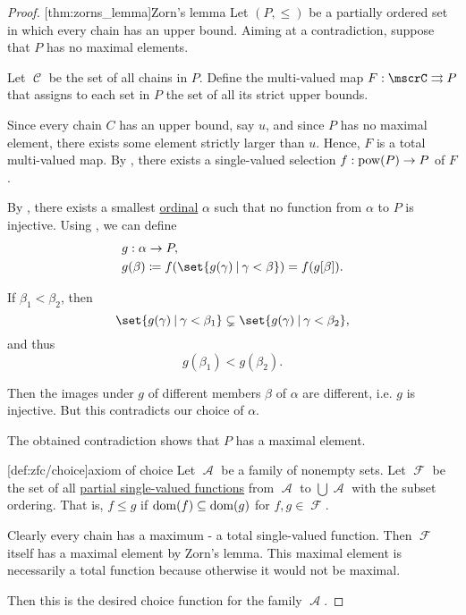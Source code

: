 \begin{proof}
  [thm:zorns_lemma]{Zorn's lemma} Let \( (P, \leq) \) be a partially ordered set in which every chain has an upper bound. Aiming at a contradiction, suppose that \( P \) has no maximal elements.

  Let \( \mscrC \) be the set of all chains in \( P \). Define the multi-valued map \( F: \mscrC \multto P \) that assigns to each set in \( P \) the set of all its strict upper bounds.

  Since every chain \( C \) has an upper bound, say \( u \), and since \( P \) has no maximal element, there exists some element strictly larger than \( u \). Hence, \( F \) is a total multi-valued map. By , there exists a single-valued selection \( f: \operatorname{pow}(P) \to P \) of \( F \).

  By , there exists a smallest \hyperref[def:ordinal]{ordinal} \( \alpha \) such that no function from \( \alpha \) to \( P \) is injective. Using , we can define
  \begin{equation*}
    \begin{aligned}
      &g: \alpha \to P, \\
      &g(\beta) \coloneqq f(\set{ g(\gamma) \given \gamma < \beta }) = f(g[\beta]). \\
    \end{aligned}
  \end{equation*}

  If \( \beta_1 < \beta_2 \), then
  \begin{equation*}
    \set{ g(\gamma) \given \gamma < \beta_1 }
    \subsetneq
    \set{ g(\gamma) \given \gamma < \beta_2 },
  \end{equation*}
  and thus
  \begin{equation*}
    g(\beta_1) < g(\beta_2).
  \end{equation*}

  Then the images under \( g \) of different members \( \beta \) of \( \alpha \) are different, i.e. \( g \) is injective. But this contradicts our choice of \( \alpha \).

  The obtained contradiction shows that \( P \) has a maximal element.

  [def:zfc/choice]{axiom of choice} Let \( \mscrA \) be a family of nonempty sets. Let \( \mscrF \) be the set of all \hyperref[def:partial_function]{partial single-valued functions} from \( \mscrA \) to \( \bigcup \mscrA \) with the subset ordering. That is, \( f \leq g \) if \( \operatorname{dom}(f) \subseteq \operatorname{dom}(g) \) for \( f, g \in \mscrF \).

  Clearly every chain has a maximum - a total single-valued function. Then \( \mscrF \) itself has a maximal element by Zorn's lemma. This maximal element is necessarily a total function because otherwise it would not be maximal.

  Then this is the desired choice function for the family \( \mscrA \).
\end{proof}

